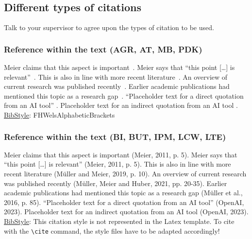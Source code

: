 \subsection{Different types of citations}
\label{sec: TypeOfCitation}
Talk to your supervisor to agree upon the types of citation to be used.

\subsubsection{Reference within the text (AGR, AT, MB, PDK)}
Meier claims that this aspect is important~.\newline
Meier says that ``this point [\dots] is relevant''~.\newline
This is also in line with more recent literature~.\newline
An overview of current research was published recently~.\newline
Earlier academic publications had mentioned this topic as a research gap~.\newline
“Placeholder text for a direct quotation from an AI tool” .\newline
Placeholder text for an indirect quotation from an AI tool .\newline
\underline{BibStyle}: \textsf{FHWelsAlphabeticBrackets}

\subsubsection{Reference within the text (BI, BUT, IPM, LCW, LTE)}
Meier claims that this aspect is important (Meier, 2011, p. 5).\newline
Meier says that “this point […] is relevant” (Meier, 2011, p. 5).\newline
This is also in line with more recent literature (Müller and Meier, 2019, p. 10).\newline
An overview of current research was published recently (Müller, Meier and Huber, 2021, pp. 20-35).\newline
Earlier academic publications had mentioned this topic as a research gap (Müller et al., 2016, p. 85).\newline
“Placeholder text for a direct quotation from an AI tool” (OpenAI, 2023). \newline
Placeholder text for an indirect quotation from an AI tool (OpenAI, 2023).\newline
\underline{BibStyle}: This citation style is not represented in the Latex template. To cite with the
\verb|\cite| command, the style files have to be adapted accordingly!

